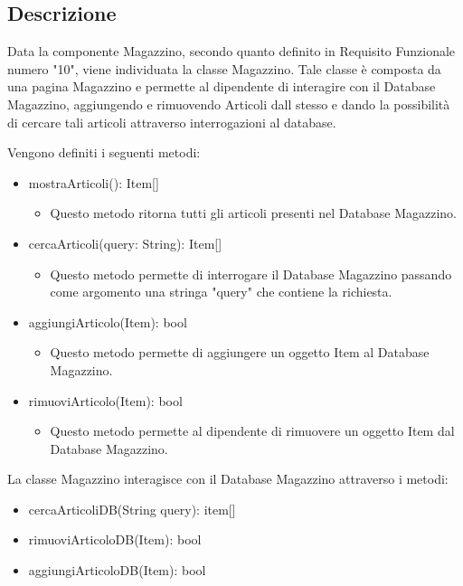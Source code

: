 \documentclass{report}
\begin{document}
\subsection*{Descrizione}
Data la componente Magazzino, secondo quanto definito in Requisito Funzionale numero "10", viene individuata la classe Magazzino. Tale classe è composta da una pagina Magazzino e permette al dipendente di interagire con il Database Magazzino, aggiungendo e rimuovendo Articoli dall stesso e dando la possibilità di cercare tali articoli attraverso interrogazioni al database. 

Vengono definiti i seguenti metodi:


\begin{itemize}
\item mostraArticoli(): Item[]
\begin{itemize}
	\item Questo metodo ritorna tutti gli articoli presenti nel Database Magazzino.
\end{itemize}

\item cercaArticoli(query: String): Item[]
\begin{itemize}
	\item Questo metodo permette di interrogare il Database Magazzino passando come argomento una stringa "query" che contiene la richiesta.
\end{itemize}

\item aggiungiArticolo(Item): bool
\begin{itemize}
	\item Questo metodo permette di aggiungere un oggetto Item al Database Magazzino.
\end{itemize}

\item rimuoviArticolo(Item): bool
\begin{itemize}
	\item Questo metodo permette al dipendente di rimuovere un oggetto Item dal Database Magazzino.
\end{itemize}

\end{itemize}

La classe Magazzino interagisce con il Database Magazzino attraverso i metodi:

\begin{itemize}
\item cercaArticoliDB(String query): item[]
\item rimuoviArticoloDB(Item): bool
\item aggiungiArticoloDB(Item): bool
\end{itemize}
\end{document}
